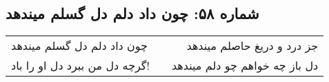 \begin{center}
\section*{شماره ۵۸: چون داد دلم دل گسلم میندهد}
\label{sec:058}
\begin{longtable}{l p{0.5cm} r}
چون داد دلم دل گسلم میندهد
&&
جز درد و دریغ حاصلم میندهد
\\
گرچه دل من ببرد دل او را باد!
&&
دل باز چه خواهم چو دلم میندهد
\\
\end{longtable}
\end{center}
